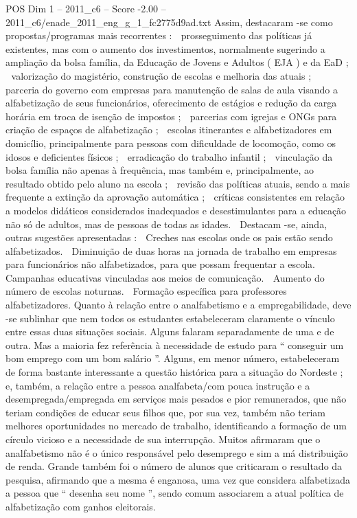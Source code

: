 \begin{textsample}{POS Dim 1 – 2011\_c6 – Score -2.00 – 2011\_c6/enade\_2011\_eng\_g\_1\_fc2775d9ad.txt}
Assim, destacaram -se como propostas/programas mais recorrentes :  prosseguimento das políticas já existentes, mas com o aumento dos investimentos, normalmente sugerindo a ampliação da bolsa família, da Educação de Jovens e Adultos ( EJA ) e da EaD ;  valorização do magistério, construção de escolas e melhoria das atuais ;  parceria do governo com empresas para manutenção de salas de aula visando a alfabetização de seus funcionários, oferecimento de estágios e redução da carga horária em troca de isenção de impostos ;  parcerias com igrejas e ONGs para criação de espaços de alfabetização ;  escolas itinerantes e alfabetizadores em domicílio, principalmente para pessoas com dificuldade de locomoção, como os idosos e deficientes físicos ;  erradicação do trabalho infantil ;  vinculação da bolsa família não apenas à frequência, mas também e, principalmente, ao resultado obtido pelo aluno na escola ;  revisão das políticas atuais, sendo a mais frequente a extinção da aprovação automática ;  críticas consistentes em relação a modelos didáticos considerados inadequados e desestimulantes para a educação não só de adultos, mas de pessoas de todas as idades.  Destacam -se, ainda, outras sugestões apresentadas :  Creches nas escolas onde os pais estão sendo alfabetizados.  Diminuição de duas horas na jornada de trabalho em empresas para funcionários não alfabetizados, para que possam frequentar a escola.  Campanhas educativas vinculadas aos meios de comunicação.  Aumento do número de escolas noturnas.  Formação específica para professores alfabetizadores.
Quanto à relação entre o analfabetismo e a empregabilidade, deve -se sublinhar que nem todos os estudantes estabeleceram claramente o vínculo entre essas duas situações sociais.
Alguns falaram separadamente de uma e de outra.
Mas a maioria fez referência à necessidade de estudo para “ conseguir um bom emprego com um bom salário ”.
Alguns, em menor número, estabeleceram de forma bastante interessante a questão histórica para a situação do Nordeste ; e, também, a relação entre a pessoa analfabeta/com pouca instrução e a desempregada/empregada em serviços mais pesados e pior remunerados, que não teriam condições de educar seus filhos que, por sua vez, também não teriam melhores oportunidades no mercado de trabalho, identificando a formação de um círculo vicioso e a necessidade de sua interrupção.
Muitos afirmaram que o analfabetismo não é o único responsável pelo desemprego e sim a má distribuição de renda.
Grande também foi o número de alunos que criticaram o resultado da pesquisa, afirmando que a mesma é enganosa, uma vez que considera alfabetizada a pessoa que “ desenha seu nome ”, sendo comum associarem a atual política de alfabetização com ganhos eleitorais.

\end{textsample}
